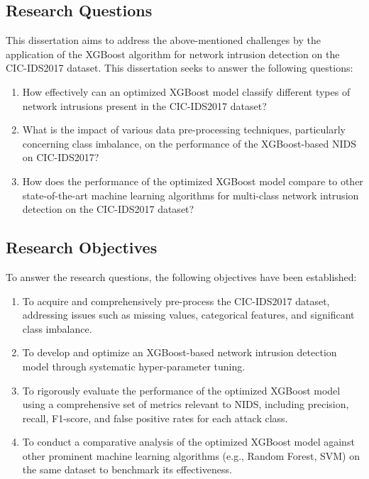 \subsection{Research Questions}
This dissertation aims to address the above-mentioned challenges by the application of the XGBoost algorithm for network intrusion detection on the CIC-IDS2017 dataset. This dissertation seeks to answer the following questions:  
\begin{enumerate}
    \item How effectively can an optimized XGBoost model classify different types of network intrusions present in the CIC-IDS2017 dataset?
    \item  What is the impact of various data pre-processing techniques, particularly concerning class imbalance, on the performance of the XGBoost-based NIDS on CIC-IDS2017?
    \item How does the performance of the optimized XGBoost model compare to other state-of-the-art machine learning algorithms for multi-class network intrusion detection on the CIC-IDS2017 dataset?
\end{enumerate}
       
\subsection{Research Objectives}
To answer the research questions, the following objectives have been established:
\begin{enumerate}
    \item To acquire and comprehensively pre-process the CIC-IDS2017 dataset, addressing issues such as missing values, categorical features, and significant class imbalance.
    \item To develop and optimize an XGBoost-based network intrusion detection model through systematic hyper-parameter tuning.
    \item To rigorously evaluate the performance of the optimized XGBoost model using a comprehensive set of metrics relevant to NIDS, including precision, recall, F1-score, and false positive rates for each attack class.
    \item To conduct a comparative analysis of the optimized XGBoost model against other prominent machine learning algorithms (e.g., Random Forest, SVM) on the same dataset to benchmark its effectiveness.
\end{enumerate}
      


